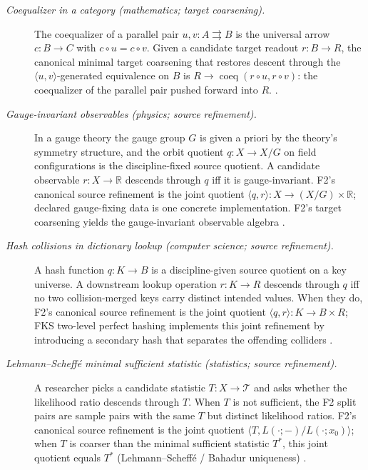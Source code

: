 \documentclass[11pt]{article}
\theoremstyle{definition}
\begin{document}
\begin{description}
\item[\emph{Coequalizer in a category (mathematics; target
coarsening).}]
The coequalizer of a parallel pair \(u, v : A \rightrightarrows B\)
is the universal arrow \(c : B \to C\) with \(c \circ u = c \circ
v\). Given a candidate target readout \(r : B \to R\), the
canonical minimal target coarsening that restores descent through
the \(\langle u, v\rangle\)-generated equivalence on \(B\) is
\(R \to \operatorname{coeq}(r \circ u, r \circ v)\): the
coequalizer of the parallel pair pushed forward into \(R\).
\citep{MacLane1998Categories}.

\item[\emph{Gauge-invariant observables (physics; source
refinement).}]
In a gauge theory the gauge group \(G\) is given a priori by the
theory's symmetry structure, and the orbit quotient
\(q : X \to X/G\) on field configurations is the discipline-fixed
source quotient. A candidate observable \(r : X \to \mathbb{R}\)
descends through \(q\) iff it is gauge-invariant. F2's canonical
source refinement is the joint quotient
\(\langle q, r\rangle : X \to (X/G) \times \mathbb{R}\); declared
gauge-fixing data is one concrete implementation. F2's target
coarsening yields the gauge-invariant observable algebra
\citep{PeskinSchroeder1995QFT}.

\item[\emph{Hash collisions in dictionary lookup (computer
science; source refinement).}]
A hash function \(q : K \to B\) is a discipline-given source
quotient on a key universe. A downstream lookup operation
\(r : K \to R\) descends through \(q\) iff no two collision-merged
keys carry distinct intended values. When they do, F2's canonical
source refinement is the joint quotient
\(\langle q, r\rangle : K \to B \times R\); FKS two-level perfect
hashing implements this joint refinement by introducing a
secondary hash that separates the offending colliders
\citep{CormenLeisersonRivestStein2009CLRS}.

\item[\emph{Lehmann--Scheff\'e minimal sufficient statistic
(statistics; source refinement).}]
A researcher picks a candidate statistic \(T : X \to \mathcal{T}\)
and asks whether the likelihood ratio descends through \(T\). When
\(T\) is not sufficient, the F2 split pairs are sample pairs with
the same \(T\) but distinct likelihood ratios. F2's canonical
source refinement is the joint quotient
\(\langle T, L(\cdot;-)/L(\cdot;x_0)\rangle\); when \(T\) is coarser
than the minimal sufficient statistic \(T^{*}\), this joint
quotient equals \(T^{*}\) (Lehmann--Scheff\'e / Bahadur uniqueness)
\citep{LehmannScheffe1950Completeness}.


\end{description}
\end{document}
